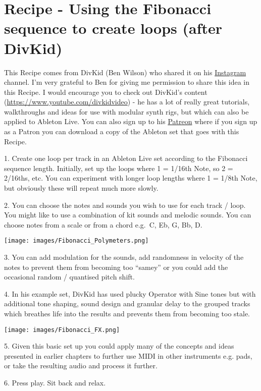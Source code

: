 \documentclass[
  12pt,
  letterpaper,
  oneside,
  open=any]{scrbook}
\begin{document}

\chapter{Recipe - Using the Fibonacci sequence to create loops (after
DivKid)}\label{Chapter-022-Recipe-Fibonacci_loops}

This Recipe comes from DivKid (Ben Wilson) who shared it on his
\href{https://www.instagram.com/divkidvideo}{Instagram} channel. I'm
very grateful to Ben for giving me permission to share this idea in this
Recipe. I would encourage you to check out DivKid's content
(\url{https://www.youtube.com/divkidvideo}) - he has a lot of really
great tutorials, walkthroughs and ideas for use with modular synth rigs,
but which can also be applied to Ableton Live. You can also sign up to
his \href{https://www.patreon.com/DivKid}{Patreon} where if you sign up
as a Patron you can download a copy of the Ableton set that goes with
this Recipe.

1. Create one loop per track in an Ableton Live set according to the
Fibonacci sequence length. Initially, set up the loops where 1 = 1/16th
Note, so 2 = 2/16ths, etc. You can experiment with longer loop lengths
where 1 = 1/8th Note, but obviously these will repeat much more slowly.

2. You can choose the notes and sounds you wish to use for each track /
loop. You might like to use a combination of kit sounds and melodic
sounds. You can choose notes from a scale or from a chord e.g.~C, Eb, G,
Bb, D.

\texttt{[image: images/Fibonacci\_Polymeters.png]}

3. You can add modulation for the sounds, add randomness in velocity of
the notes to prevent them from becoming too ``samey'' or you could add
the occasional random / quantised pitch shift.

4. In his example set, DivKid has used plucky Operator with Sine tones
but with additional tone shaping, sound design and granular delay to the
grouped tracks which breathes life into the results and prevents them
from becoming too stale.

\texttt{[image: images/Fibonacci\_FX.png]}

5. Given this basic set up you could apply many of the concepts and
ideas presented in earlier chapters to further use MIDI in other
instruments e.g. pads, or take the resulting audio and process it
further.

6. Press play. Sit back and relax.
\end{document}
